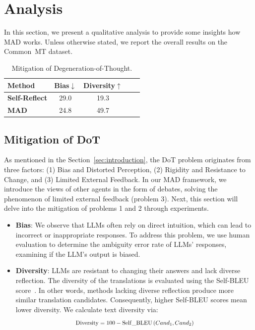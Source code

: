 \section{Analysis}
\label{sec:analysis}

In this section, we present a qualitative analysis to provide some insights how MAD works.
Unless otherwise stated, we report the overall results on the Common~MT dataset.

\begin{table}[t]
\centering
\begin{tabular}{l cc cc}
\toprule
\bf Method & \bf Bias$\downarrow$ & \bf Diversity$\uparrow$\\
\midrule
\textbf{Self-Reflect}  & 29.0 & 19.3\\
\textbf{MAD}                  & 24.8 & 49.7\\
\bottomrule
\end{tabular}
\vspace{-5pt}
\caption{Mitigation of Degeneration-of-Thought.}
\label{tab:mitigate-dot}
\end{table}



\subsection{Mitigation of DoT}

As mentioned in the Section~\ref{sec:introduction}, the DoT problem originates from three factors: (1) Bias and Distorted Perception, (2) Rigidity and Resistance to Change, and (3) Limited External Feedback. In our MAD framework, we introduce the views of other agents in the form of debates, solving the phenomenon of limited external feedback (problem 3). Next, this section will delve into the mitigation of problems 1 and 2 through experiments.

\begin{itemize}[leftmargin=10pt]
    \item \textbf{Bias}: We observe that LLMs often rely on direct intuition, which can lead to incorrect or inappropriate responses. To address this problem, we use human evaluation to determine the ambiguity error rate of LLMs' responses, examining if the LLM's output is biased.
    \item \textbf{Diversity}: LLMs are resistant to changing their answers and lack diverse reflection. The diversity of the translations is evaluated using the Self-BLEU score~\citep{yin2020meta}. In other words, methods lacking diverse reflection produce more similar translation candidates. Consequently, higher Self-BLEU scores mean lower diversity. We calculate text diversity via:
    \begin{equation}
    \scalebox{0.84}{$
    \mathrm{Diversity} = 100-\mathrm{Self\_BLEU}\left(Cand_1, Cand_2\right)
    $}
    \label{formula:diversity}
    \end{equation}
\end{itemize}

